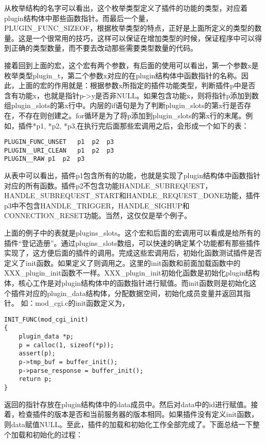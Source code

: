 \documentclass[12pt, a4paper, dvipdfm]{book}
\begin{document}
从枚举结构的名字可以看出，这个枚举类型定义了插件的功能的类型，对应着plugin结构体中那些函数指针。而最后一个量，\\PLUGIN\_FUNC\_SIZEOF，根据枚举类型的特点，正好是上面所定义的类型的数量。这是一个很常用的技巧，这样可以保证在增加类型的时候，保证程序中可以得到正确的类型数量，而不要去改动那些需要类型数量的代码。


接着回到上面的宏，这个宏有两个参数，有后面的使用可以看出，第一个参数x是枚举类型plugin\_t，第二个参数x对应的在plugin结构体中函数指针的名称。因此，上面的宏的作用就是：根据参数x所指定的插件功能类型，判断插件p中是否含有功能x，也就是指针p->y是否非NULL。如果包含功能x，则将指针p添加到数组plugin\_slots的第x行中。内层的if语句是为了判断plugin\_slots的第x行是否存在，不存在则创建之。for循环是为了将p添加到plugin\_slots的第x行的末尾。例如，插件*p1, *p2, *p3,在执行完后面那些宏调用之后，会形成一个如下的表：

\begin{verbatim}
PLUGIN_FUNC_UNSET	p1	p2	p3
PLUGIN__URI_CLEAN	p1	p2	p3
PLUGIN__RAW	p1	p2	p3
\end{verbatim}

从表中可以看出，插件p1包含所有的功能，也就是实现了plugin结构体中函数指针对应的所有函数。插件p2不包含功能HANDLE\_SUBREQUEST，HANDLE\_SUBREQUEST\_START和HANDLE\_REQUEST\_DONE功能，插件p3中不包含HANDLE\_TRIGGER，HANDLE\_SIGHUP和\\CONNECTION\_RESET功能。当然，这仅仅是举个例子。


上面的例子中的表就是plugins\_slots。这个宏和后面的宏调用可以看成是给所有的插件“登记造册”。通过plugins\_slots数组，可以快速的确定某个功能都有那些插件实现了，这方便后面的插件的调用。完成这些宏调用后，初始化函数测试插件是否定义了init函数。如果定义了则调用之。这里的init函数和前面加载函数中的XXX\_plugin\_init函数不一样。XXX\_plugin\_init初始化函数是初始化plugin结构体，核心工作是对plugin结构体中的函数指针进行赋值。而init函数则是初始化这个插件对应的plugin\_data结构体，分配数据空间，初始化成员变量并返回其指针。
如：mod\_cgi.c的init函数定义为，

\begin{verbatim}
INIT_FUNC(mod_cgi_init)
{
	plugin_data *p;
	p = calloc(1, sizeof(*p));
	assert(p);
	p->tmp_buf = buffer_init();
	p->parse_response = buffer_init();
	return p;
}
\end{verbatim}

返回的指针存放在plugin结构体中的data成员中。然后对data中的id进行赋值。接着，检查插件的版本是否和当前服务器的版本相同。如果插件没有定义init函数，则data赋值NULL。至此，插件的加载和初始化工作全部完成了。下面总结一下整个加载和初始化的过程：
\end{document}
